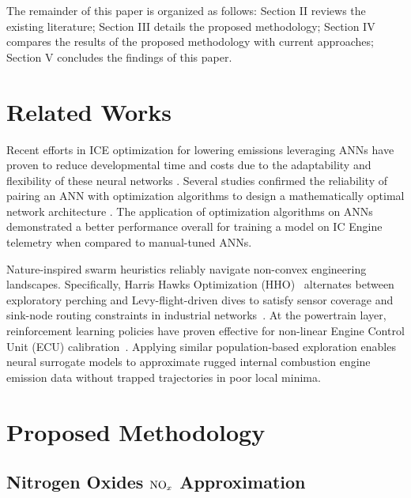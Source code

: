 \documentclass[runningheads]{llncs}
\begin{document}
The remainder of this paper is organized as follows: Section II reviews the existing literature; Section III details the
proposed methodology; Section IV compares the results of the proposed methodology with current approaches; Section V
concludes the findings of this paper.

\section{Related Works}

Recent efforts in ICE optimization for lowering emissions leveraging ANNs have proven to reduce developmental time and
costs \cite{bhattApplicationArtificialNeural2022, tuanhoangReviewApplicationArtificial2021} due to the adaptability and
flexibility of these neural networks \cite{karunamurthyPredictionICEngine2023,
inezahavugimanaReviewArtificialIntelligent2023}. Several studies confirmed the reliability of pairing an ANN with
optimization algorithms to design a mathematically optimal network architecture
\cite{sharmaApplicationMachineLearning2023, usluOptimizationDieselEngine2020, singhSampleddataModelValidation2020}. The
application of optimization algorithms on ANNs demonstrated a better performance overall for training a model on IC
Engine telemetry \cite{gunawanApplicationArtificialNeural2024} when compared to manual-tuned ANNs.

Nature-inspired swarm heuristics reliably navigate non-convex engineering landscapes.
Specifically, Harris Hawks Optimization (HHO)~\cite{heidariHarrisHawksOptimization2019} alternates
between exploratory perching and Levy-flight-driven dives to satisfy sensor coverage and sink-node
routing constraints in industrial networks~\cite{abdulrab2022optimal, abdulrab2022hho}.
At the powertrain layer, reinforcement learning policies have proven effective for non-linear Engine
Control Unit (ECU) calibration~\cite{omranDeepReinforcementLearning2024}.
Applying similar population-based exploration enables neural surrogate models to approximate
rugged internal combustion engine emission data without trapped trajectories in poor local minima.

\section{Proposed Methodology}

\subsection{Nitrogen Oxides $\ce{NO_x}$ Approximation}\label{sec:nox-modelling}
\end{document}
